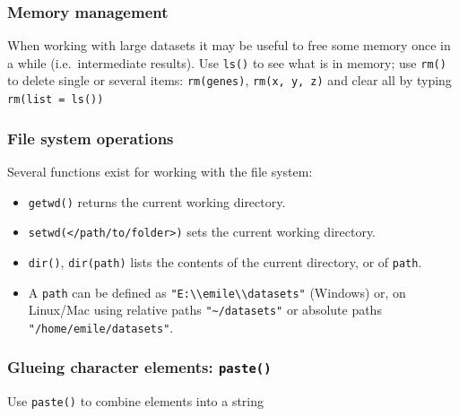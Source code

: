 \documentclass[]{book}
\providecommand{\tightlist}{%
  \setlength{\itemsep}{0pt}\setlength{\parskip}{0pt}}
\begin{document}
\hypertarget{memory-management}{%
\subsubsection*{Memory management}\label{memory-management}}

When working with large datasets it may be useful to free some memory once in a while (i.e.~intermediate results). Use \texttt{ls()} to see what is in memory; use \texttt{rm()} to delete single or several items: \texttt{rm(genes)}, \texttt{rm(x,\ y,\ z)} and clear all by typing \texttt{rm(list\ =\ ls())}

\hypertarget{file-system-operations}{%
\subsubsection*{File system operations}\label{file-system-operations}}

Several functions exist for working with the file system:

\begin{itemize}
\tightlist
\item
  \texttt{getwd()} returns the current working directory.
\item
  \texttt{setwd(\textless{}/path/to/folder\textgreater{})} sets the current working directory.
\item
  \texttt{dir()}, \texttt{dir(path)} lists the contents of the current directory, or of \texttt{path}.
\item
  A \texttt{path} can be defined as \texttt{"E:\textbackslash{}\textbackslash{}emile\textbackslash{}\textbackslash{}datasets"} (Windows) or, on Linux/Mac using relative paths \texttt{"\textasciitilde{}/datasets"} or absolute paths \texttt{"/home/emile/datasets"}.
\end{itemize}

\hypertarget{glueing-character-elements-paste}{%
\subsubsection*{\texorpdfstring{Glueing character elements: \texttt{paste()}}{Glueing character elements: paste()}}\label{glueing-character-elements-paste}}

Use \texttt{paste()} to combine elements into a string
\end{document}
